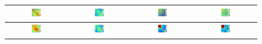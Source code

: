 \begin{figure}[thp]
\begin{tabular}{|cc|cc|}
    \midrule
    
    \includegraphics[width=0.24\textwidth]{figures/cos_simmat_dino_6.png}\label{fig:f4} &
    \includegraphics[width=0.24\textwidth]{figures/cos_simmat_gvit_6.png}\label{fig:f4} &
    \includegraphics[width=0.24\textwidth]{figures/cos_simmat_dino_7.png} &
    \includegraphics[width=0.24\textwidth]{figures/cos_simmat_gvit_7.png}\label{fig:f4} \\
    
    \midrule
    
    \includegraphics[width=0.24\textwidth]{figures/cos_simmat_dino_8.png}\label{fig:f4} &
    \includegraphics[width=0.24\textwidth]{figures/cos_simmat_gvit_8.png}\label{fig:f4} &
    \includegraphics[width=0.24\textwidth]{figures/cos_simmat_dino_9.png} &
    \includegraphics[width=0.24\textwidth]{figures/cos_simmat_gvit_9.png}\label{fig:f4} \\
   \hline
  \end{tabular}
  

\end{figure}
